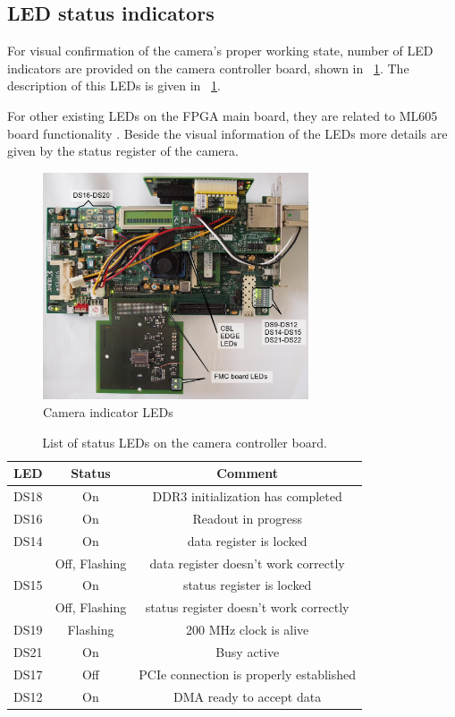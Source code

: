 \subsection{LED status indicators}

For visual confirmation of the camera's proper working state, number of LED indicators are provided on the camera controller board, shown in \figurename~\ref{pic_LED}. The description of this LEDs is given in \tablename~\ref{LEDs}. 

For other existing LEDs on the FPGA main board, they are related to ML605 board functionality \cite{XILINX:ML605}.
Beside the visual information of the LEDs more details are given by the status register of the camera. 

\begin{figure}[p]
\centering
\includegraphics[width=0.7\textwidth]{images/pic_LEDs.png}
\caption{\label{pic_LED} Camera indicator LEDs}
\end{figure}


\begin{table}[p]
\caption{\label{LEDs} List of status LEDs on the camera controller board.}
\begin{center}
\begin{tabular}{|c|c|c|}
\hline
LED					& Status 		& Comment \\
\hline
DS18 				& On			&  DDR3 initialization has completed \\
\hline
DS16				& On			& Readout in progress \\
\hline
DS14				& On			& data register is locked\\
\hline
					& Off, Flashing	& data register doesn’t work correctly \\
\hline
DS15				& On			& status register is locked\\
\hline
					& Off, Flashing	& status register doesn’t work correctly \\
\hline
DS19				& Flashing	& 200 MHz clock is alive \\
\hline
DS21				& On			& Busy active \\
\hline
DS17				& Off			& PCIe connection is properly established \\
\hline
DS12				& On			& DMA ready to accept data \\

\hline
\end{tabular}
\end{center}
\end{table}


